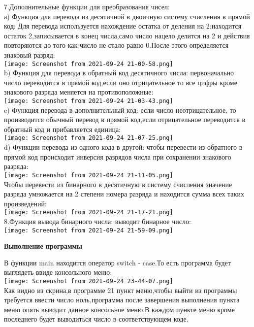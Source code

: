 \documentclass[a4paper,11pt]{article}
\begin{document}
\begin{flushleft}
7.Дополнительные функции для преобразования чисел: \\
а) Функция для перевода из десятичной в двоичную систему счисления в прямой код: Для перевода используется нахождение остатка от деления на 2:находится остаток 2,записывается в конец числа,само число нацело делится на 2 и действия повторяются до того как число не стало равно 0.После этого определяется знаковый разряд: \\
\texttt{[image: Screenshot from 2021-09-24 21-00-58.png]} \\
b) Функция для перевода в обратный код десятичного числа: первоначально число переводится в прямой код,если оно отрицательное то все цифры кроме знакового разряда меняется на противоположные: \\
\texttt{[image: Screenshot from 2021-09-24 21-03-43.png]} \\
c) Функция перевода в дополнительный код: если число неотрицательное, то производится обычный перевод в прямой код,если отрицательное переводится в обратный код и прибавляется единица: \\
\texttt{[image: Screenshot from 2021-09-24 21-07-25.png]} \\
d) Функции перевода из одного кода в другой: чтобы перевести из обратного в прямой код происходит инверсия разрядов числа при сохранении знакового разряда: \\
\texttt{[image: Screenshot from 2021-09-24 21-11-05.png]} \\
Чтобы перевести из бинарного в десятичную в систему счисления значение разряда умножается на 2 степени номера разряда и находится сумма всех таких произведений: \\
\texttt{[image: Screenshot from 2021-09-24 21-17-21.png]} \\
8.Функция вывода бинарного числа: выводит бинарное число: \\
\texttt{[image: Screenshot from 2021-09-24 21-59-09.png]} \\
\begin{center}
    \textbf{Выполнение программы}
\end{center}
В функции main находится оператор switch - case.То есть программа будет выглядеть ввиде консольного меню: \\
\texttt{[image: Screenshot from 2021-09-24 23-44-07.png]} \\
Как видно из скрина,в программе 21 пункт меню,чтобы выйти из программы требуется ввести число ноль,программа после завершения выполнения пункта меню опять выводит данное консольное меню.В каждом пункте меню кроме последнего будет выводиться число в соответствующем коде. \\

\end{flushleft}
\end{document}
